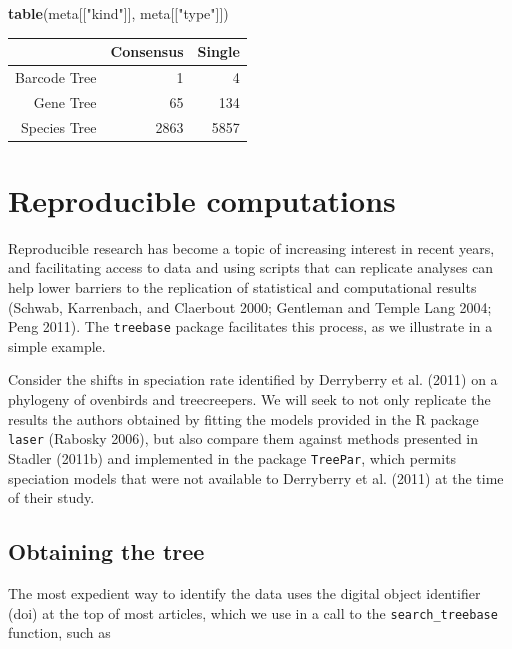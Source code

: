 \documentclass[author-year, 8pt, 3p]{elsarticle} %
\newenvironment{Shaded}{}{}
\newcommand{\KeywordTok}[1]{\textcolor[rgb]{0.00,0.44,0.13}{\textbf{{#1}}}}
\newcommand{\StringTok}[1]{\textcolor[rgb]{0.25,0.44,0.63}{{#1}}}
\newcommand{\NormalTok}[1]{{#1}}
\begin{document}
\begin{Shaded}
\begin{Highlighting}[]
\KeywordTok{table}\NormalTok{(meta[[}\StringTok{"kind"}\NormalTok{]], meta[[}\StringTok{"type"}\NormalTok{]])}
\end{Highlighting}
\end{Shaded}
\begin{table}[ht]
\begin{center}
\begin{tabular}{rrr}
  \hline
 & Consensus & Single \\ 
  \hline
Barcode Tree &   1 &   4 \\ 
  Gene Tree &  65 & 134 \\ 
  Species Tree & 2863 & 5857 \\ 
   \hline
\end{tabular}
\end{center}
\end{table}

\section{Reproducible computations}

Reproducible research has become a topic of increasing interest in
recent years, and facilitating access to data and using scripts that can
replicate analyses can help lower barriers to the replication of
statistical and computational results (Schwab, Karrenbach, and Claerbout
2000; Gentleman and Temple Lang 2004; Peng 2011). The \texttt{treebase}
package facilitates this process, as we illustrate in a simple example.

Consider the shifts in speciation rate identified by Derryberry et al.
(2011) on a phylogeny of ovenbirds and treecreepers. We will seek to not
only replicate the results the authors obtained by fitting the models
provided in the R package \texttt{laser} (Rabosky 2006), but also
compare them against methods presented in Stadler (2011b) and
implemented in the package \texttt{TreePar}, which permits speciation
models that were not available to Derryberry et al. (2011) at the time
of their study.

\subsection{Obtaining the tree}

The most expedient way to identify the data uses the digital object
identifier (doi) at the top of most articles, which we use in a call to
the \texttt{search\_treebase} function, such as
\end{document}
